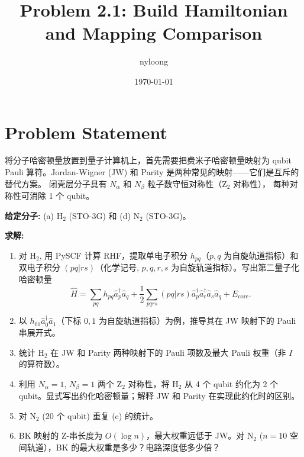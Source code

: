 \documentclass[fontset=mac]{ctexart}
\title{Problem 2.1: Build Hamiltonian and Mapping Comparison}
\author{nyloong}
\date{\today}
\newcommand{\adag}[1]{\hat{a}_{#1}^\dagger}
\newcommand{\aop}[1]{\hat{a}_{#1}}
\begin{document}
\maketitle

\section*{Problem Statement}

将分子哈密顿量放置到量子计算机上，首先需要把费米子哈密顿量映射为 qubit
Pauli 算符。Jordan-Wigner (JW) 和 Parity 是两种常见的映射——它们是互斥的替代方案。
闭壳层分子具有 $N_\alpha$ 和 $N_\beta$ 粒子数守恒对称性（Z$_2$ 对称性），
每种对称性可消除 1 个 qubit。

\textbf{给定分子:} (a) H$_2$ (STO-3G) 和 (d) N$_2$ (STO-3G)。

\textbf{求解:}
\begin{enumerate}
    \item[(a)] 对 H$_2$, 用 PySCF 计算 RHF，提取单电子积分 $h_{pq}$（$p,q$ 为自旋轨道指标）和双电子积分 $(pq|rs)$（化学记号, $p,q,r,s$ 为自旋轨道指标）。写出第二量子化哈密顿量
    \[
    \hat{H} = \sum_{pq} h_{pq} \adag{p} \aop{q}
            + \frac{1}{2} \sum_{pqrs} (pq|rs) \adag{p} \adag{r} \aop{s} \aop{q}
            + E_{\text{core}}.
    \]

    \item[(b)] 以 $h_{01}\adag{0}\aop{1}$（下标 $0,1$ 为自旋轨道指标）为例，推导其在 JW 映射下的 Pauli 串展开式。

    \item[(c)] 统计 H$_2$ 在 JW 和 Parity 两种映射下的 Pauli 项数及最大 Pauli 权重（非 $I$ 的算符数）。

    \item[(d)] 利用 $N_\alpha=1$, $N_\beta=1$ 两个 Z$_2$ 对称性，将 H$_2$ 从 4 个 qubit 约化为 2 个 qubit。显式写出约化哈密顿量；解释 JW 和 Parity 在实现此约化时的区别。

    \item[(e)] 对 N$_2$ (20 个 qubit) 重复 (c) 的统计。

    \item[\textbf{Advanced Challenge}] BK 映射的 Z-串长度为 $O(\log n)$，最大权重远低于 JW。对 N$_2$ ($n=10$ 空间轨道），BK 的最大权重是多少？电路深度低多少倍？
\end{enumerate}

\newpage

\end{document}
